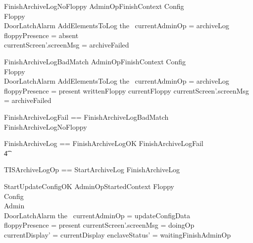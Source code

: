 \begin{schema}{FinishArchiveLogNoFloppy}
        AdminOpFinishContext
\also
        \Xi Config
\\      \Xi Floppy
\\      \Xi DoorLatchAlarm
\also
        AddElementsToLog
\where
       the~ currentAdminOp = archiveLog
\\      floppyPresence = absent
\also
\\      currentScreen'.screenMsg = archiveFailed
\end{schema}

\begin{schema}{FinishArchiveLogBadMatch}
        AdminOpFinishContext
\also
        \Xi Config
\\      \Xi Floppy
\\      \Xi DoorLatchAlarm
\also
        AddElementsToLog
\where
        the~ currentAdminOp = archiveLog
\\      floppyPresence = present
\also
        writtenFloppy \neq currentFloppy
\also
        currentScreen'.screenMsg = archiveFailed
\end{schema}

\begin{zed}
        FinishArchiveLogFail == FinishArchiveLogBadMatch \lor
        FinishArchiveLogNoFloppy
\also
\end{zed}

\begin{zed}
        FinishArchiveLog == FinishArchiveLogOK \lor FinishArchiveLogFail
\\ \t4  \lor
        [~ BadAdminLogout | enclaveStatus = waitingFinishAdminOp
\\ \t6  \land the~ currentAdminOp = archiveLog      ~]
\end{zed}

\begin{zed}
        TISArchiveLogOp == StartArchiveLog \lor FinishArchiveLog
\end{zed}

\begin{schema}{StartUpdateConfigOK}
        AdminOpStartedContext
\also   
        \Xi Floppy
\\      \Xi Config
\\      \Xi Admin     
\\      \Xi DoorLatchAlarm
\where
       the~ currentAdminOp = updateConfigData
\\      floppyPresence = present
\also
        currentScreen'.screenMsg = doingOp
\\      currentDisplay' = currentDisplay
\also
        enclaveStatus' = waitingFinishAdminOp
\end{schema}

